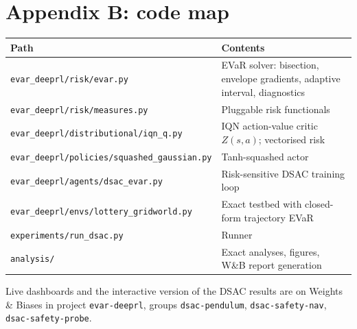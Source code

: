 \documentclass[11pt,a4paper]{article}
\begin{document}
\section*{Appendix B: code map}

\small
\begin{center}
\begin{tabular}{@{}p{}p{}@{}}
\toprule
\textbf{Path} & \textbf{Contents} \\
\midrule
\texttt{evar\_deeprl/risk/evar.py} & EVaR solver: bisection, envelope gradients, adaptive interval, diagnostics \\
\texttt{evar\_deeprl/risk/measures.py} & Pluggable risk functionals \\
\texttt{evar\_deeprl/distributional/iqn\_q.py} & IQN action-value critic $Z(s,a)$; vectorised risk \\
\texttt{evar\_deeprl/policies/squashed\_gaussian.py} & Tanh-squashed actor \\
\texttt{evar\_deeprl/agents/dsac\_evar.py} & Risk-sensitive DSAC training loop \\
\texttt{evar\_deeprl/envs/lottery\_gridworld.py} & Exact testbed with closed-form trajectory EVaR \\
\texttt{experiments/run\_dsac.py} & Runner \\
\texttt{analysis/} & Exact analyses, figures, W\&B report generation \\
\bottomrule
\end{tabular}
\end{center}
\normalsize

\vspace{1em}
\noindent\textcolor{soft}{\small Live dashboards and the interactive version of the
DSAC results are on Weights \& Biases in project \texttt{evar-deeprl}, groups
\texttt{dsac-pendulum}, \texttt{dsac-safety-nav}, \texttt{dsac-safety-probe}.}
\end{document}
